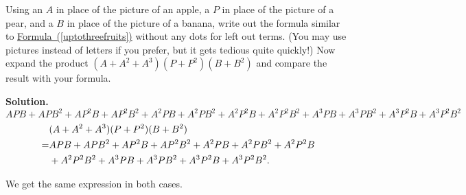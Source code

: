 \documentclass{book}
\begin{document}
\setcounter{project}{236}
\addtocounter{project}{-1}
\begin{activity}[]\label{twopiecesoffruit}
\hypertarget{p-1283}{}%
Using an \(A\) in place of the picture of an apple, a \(P\) in place of the picture of a pear, and a \(B\) in place of the picture of a banana, write out the formula similar to \hyperref[uptothreefruits]{Formula~(\ref{uptothreefruits})} without any dots for left out terms. (You may use pictures instead of letters if you prefer, but it gets tedious quite quickly!) Now expand the product \((A+A^2+A^3)(P+P^2)(B+B^2)\) and compare the result with your formula.%
\par\smallskip%
\noindent\textbf{Solution.}\hypertarget{solution-146}{}\quad%
\hypertarget{p-1284}{}%
\(APB+APB^2 +AP^2B+ AP^2B^2+ A^2PB+A^2PB^2+ A^2P^2B+ A^2P^2B^2+
A^3PB+A^3PB^2 +A^3P^2B+ A^3P^2B^2\)%
\begin{align*}
& (A+A^2+A^3)(P+P^2)(B+B^2)\\
=& APB+APB^2+AP^2B+AP^2B^2+A^2PB+A^2PB^2+A^2P^2B\\
& + A^2P^2B^2+
A^3PB+A^3PB^2+A^3P^2B+A^3P^2B^2.
\end{align*}
%
\par
\hypertarget{p-1285}{}%
We get the same expression in both cases.%
\end{activity}
\end{document}
